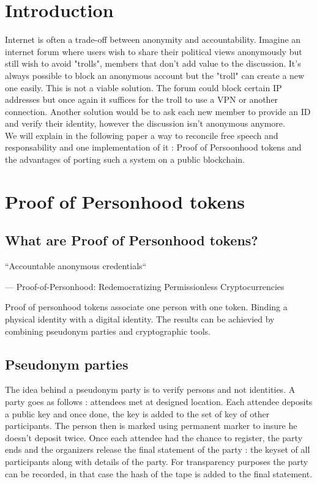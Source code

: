 \documentclass[11pt, a4paper, twoside, openright]{book} %
\begin{document}





\newpage

\section{Introduction}
Internet is often a	trade-off between anonymity and accountability. Imagine an internet forum where users wish to share their political views anonymously but still wish to avoid "trolls", members that don't add value to the discussion. It's always possible to block an anonymous account but the "troll" can create a new one easily. This is not a viable solution. The forum could block certain IP addresses but once again it suffices for the troll to use a VPN or another connection. Another solution would be to ask each new member to provide an ID and verify their identity, however the discussion isn't anonymous anymore. \\
We will explain in the following paper a way to reconcile free speech and responsability and one implementation of it : Proof of Persoonhood tokens and the advantages of porting such a system on a public blockchain.



\section{Proof of Personhood tokens}
\subsection{What are Proof of Personhood tokens?}

\epigraph{``Accountable anonymous credentials``}
{--- \textup{Proof-of-Personhood: Redemocratizing Permissionless Cryptocurrencies}}

Proof of personhood tokens associate one person with one token. Binding a physical identity with a digital identity. The results can be achievied by combining pseudonym parties and cryptographic tools.

\subsection{Pseudonym parties}

The idea behind a pseudonym party is to verify persons and not identities. A party goes as follows :  attendees met at designed location. Each attendee deposits a public key and once done, the key is added to the set of key of other participants. The person then is marked using permanent marker to insure he doesn't deposit twice. Once each attendee had the chance to register, the party ends and the organizers release the final statement of the party : the keyset of all participants along with details of the party. For transparency purposes the party can be recorded, in that case the hash of the tape is added to the final statement. 
 
\end{document}
